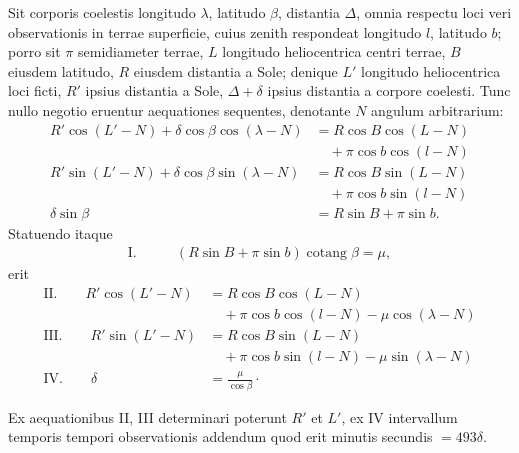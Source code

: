 Sit corporis coelestis longitudo $\lambda$, latitudo $\beta$, distantia $\Delta$, omnia respectu loci veri observationis in terrae superficie, cuius zenith respondeat longitudo $l$, latitudo $b$; porro sit $\pi$ semidiameter terrae, $L$ longitudo heliocentrica centri terrae, $B$ eiusdem latitudo, $R$ eiusdem distantia a Sole; denique $L'$ longitudo heliocentrica loci ficti, $R'$ ipsius distantia a Sole, $\Delta+\delta$ ipsius distantia a corpore coelesti. Tunc nullo negotio eruentur aequationes sequentes, denotante $N$ angulum arbitrarium:
\[
\begin{aligned}
R'\cos(L'-N)+\delta\cos\beta\cos(\lambda-N)
  &=R\cos B\cos(L-N)\\
  &\quad+\pi\cos b\cos(l-N)\\
R'\sin(L'-N)+\delta\cos\beta\sin(\lambda-N)
  &=R\cos B\sin(L-N)\\
  &\quad+\pi\cos b\sin(l-N)\\
\delta\sin\beta&=R\sin B+\pi\sin b.
\end{aligned}
\]
Statuendo itaque
\[
\begin{aligned}
\mathrm{I.}\qquad &(R\sin B+\pi\sin b)\operatorname{cotang}\beta=\mu,
\end{aligned}
\]
erit
\[
\begin{aligned}
\mathrm{II.}\qquad R'\cos(L'-N)&=R\cos B\cos(L-N)\\
 &\quad+\pi\cos b\cos(l-N)-\mu\cos(\lambda-N)\\
\mathrm{III.}\qquad R'\sin(L'-N)&=R\cos B\sin(L-N)\\
 &\quad+\pi\cos b\sin(l-N)-\mu\sin(\lambda-N)\\
\mathrm{IV.}\qquad \delta&=\frac{\mu}{\cos\beta}\mathpunct{\cdot}
\end{aligned}
\]

Ex aequationibus II, III determinari poterunt $R'$ et $L'$, ex IV intervallum temporis tempori observationis addendum quod erit minutis secundis $=493\delta$.

